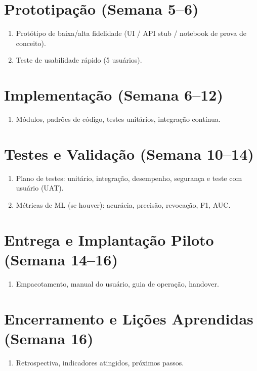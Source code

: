 \section{Prototipação (Semana 5–6)}
\begin{enumerate}
    \item Protótipo de baixa/alta fidelidade (UI / API stub / notebook de prova de conceito).
    \item Teste de usabilidade rápido (5 usuários).
\end{enumerate}

\section{Implementação (Semana 6–12)}
\begin{enumerate}
    \item Módulos, padrões de código, testes unitários, integração contínua.
\end{enumerate}

\section{Testes e Validação (Semana 10–14)}
\begin{enumerate}
    \item Plano de testes: unitário, integração, desempenho, segurança e teste com usuário (UAT).
    \item Métricas de ML (se houver): acurácia, precisão, revocação, F1, AUC.
\end{enumerate}

\section{Entrega e Implantação Piloto (Semana 14–16)}
\begin{enumerate}
    \item Empacotamento, manual do usuário, guia de operação, handover.
\end{enumerate}

\section{Encerramento e Lições Aprendidas (Semana 16)}
\begin{enumerate}
    \item Retrospectiva, indicadores atingidos, próximos passos.
\end{enumerate}
